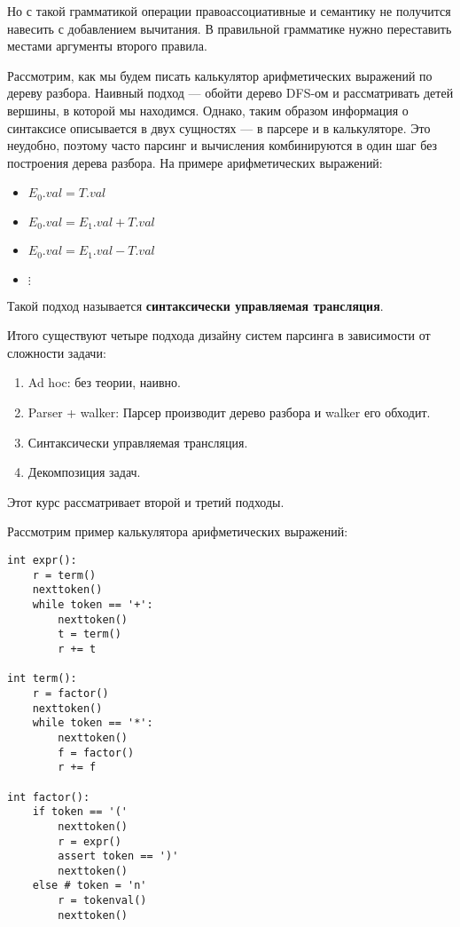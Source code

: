 Но с такой грамматикой операции правоассоциативные и семантику не получится навесить с добавлением вычитания. В правильной грамматике нужно переставить местами аргументы второго правила.

Рассмотрим, как мы будем писать калькулятор арифметических выражений по дереву разбора. Наивный подход --- обойти дерево DFS-ом и рассматривать детей вершины, в которой мы находимся. Однако, таким образом информация о синтаксисе описывается в двух сущностях --- в парсере и в калькуляторе. Это неудобно, поэтому часто парсинг и вычисления комбинируются в один шаг без построения дерева разбора. На примере арифметических выражений:
\begin{itemize}
    \item \(E_0.val = T.val\)
    \item \(E_0.val = E_1.val + T.val\)
    \item \(E_0.val = E_1.val - T.val\)
    \item \(\vdots\)
\end{itemize}

Такой подход называется \textbf{синтаксически управляемая трансляция}.

Итого существуют четыре подхода дизайну систем парсинга в зависимости от сложности задачи:
\begin{enumerate}
    \item Ad hoc: без теории, наивно.
    \item Parser + walker: Парсер производит дерево разбора и walker его обходит.
    \item Синтаксически управляемая трансляция.
    \item Декомпозиция задач.
\end{enumerate}

Этот курс рассматривает второй и третий подходы.

Рассмотрим пример калькулятора арифметических выражений:
\begin{verbatim}
int expr():
    r = term()
    nexttoken()
    while token == '+':
        nexttoken()
        t = term()
        r += t

int term():
    r = factor()
    nexttoken()
    while token == '*':
        nexttoken()
        f = factor()
        r += f

int factor():
    if token == '('
        nexttoken()
        r = expr()
        assert token == ')'
        nexttoken()
    else # token = 'n'
        r = tokenval()
        nexttoken()
\end{verbatim}

